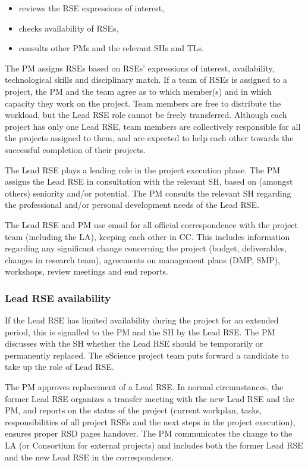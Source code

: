\documentclass[11pt]{article}
\begin{document}
\begin{itemize}
\item reviews the RSE expressions of interest,
\item checks availability of RSEs,
\item consults other PMs and the relevant SHs and TLs.
\end{itemize}

The PM assigns RSEs based on RSEs' expressions of interest, availability, technological skills and
disciplinary match. If a team of RSEs is assigned to a project, the PM and the team agree as to which member(s) and in
which capacity they work on the project. Team members are free to distribute the workload, but the Lead RSE role cannot
be freely transferred. Although each project has only one Lead RSE, team members are collectively responsible for all
the projects assigned to them, and are expected to help each other towards the successful completion of their
projects.

The Lead RSE plays a leading role in the project execution phase. The PM assigns the Lead RSE in consultation with the
relevant SH, based on (amongst others) seniority and/or potential. The PM consults the relevant SH regarding the
professional and/or personal development needs of the Lead RSE.

The Lead RSE and PM use email for all official correspondence with the project team (including the LA), keeping each
other in CC. This includes information regarding any significant change concerning the project (budget, deliverables,
changes in research team), agreements on management plans (DMP, SMP), workshops, review meetings and end reports.

\subsubsection{Lead RSE availability}
If the Lead RSE has limited availability during the project for an extended period, this is signalled to the PM and the
SH by the Lead RSE. The PM discusses with the SH whether the Lead RSE should be temporarily or permanently replaced.
The eScience project team puts forward a candidate to take up the role of Lead RSE.

The PM approves replacement of a Lead RSE. In normal circumstances, the former Lead RSE organizes a transfer meeting
with the new Lead RSE and the PM, and reports on the status of the project (current workplan, tasks, responsibilities
of all project RSEs and the next steps in the project execution), ensures proper RSD pages handover. The PM
communicates the change to the LA (or Consortium for external projects) and includes both the former Lead RSE and the
new Lead RSE in the correspondence.
\end{document}
